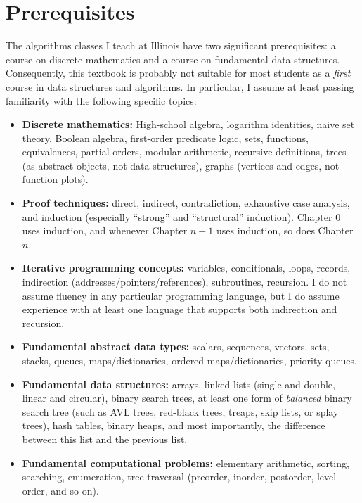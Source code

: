 \section*{Prerequisites}

The algorithms classes I teach at Illinois have two significant prerequisites: a course on discrete mathematics and a course on fundamental data structures. Consequently, this textbook is probably not suitable for most students as a \textit{first} course in data structures and algorithms. In particular, I assume at least passing familiarity with the following specific topics:

\begin{itemize}
\item \textbf{Discrete mathematics:} High-school algebra, logarithm identities, naive set theory, Boolean algebra, first-order predicate logic, sets, functions, equivalences, partial orders, modular arithmetic, recursive definitions, trees (as abstract objects, not data structures), graphs (vertices and edges, not function plots).
\item \textbf{Proof techniques:} direct, indirect, contradiction, exhaustive case analysis, and induction (especially “strong” and “structural” induction). Chapter 0 uses induction, and whenever Chapter $n-1$ uses induction, so does Chapter $n$.
\item \textbf{Iterative programming concepts:} variables, conditionals, loops, records, indirection (addresses/pointers/references), subroutines, recursion. I do not assume fluency in any particular programming language, but I do assume experience with at least one language that supports both indirection and recursion.
\item \textbf{Fundamental abstract data types:} scalars, sequences, vectors, sets, stacks, queues, maps/dictionaries, ordered maps/dictionaries, priority queues.
\item \textbf{Fundamental data structures:} arrays, linked lists (single and double, linear and circular), binary search trees, at least one form of \textit{balanced} binary search tree (such as AVL trees, red-black trees, treaps, skip lists, or splay trees), hash tables, binary heaps, and most importantly, the difference between this list and the previous list.
\item \textbf{Fundamental computational problems:} elementary arithmetic, sorting, searching, enumeration, tree traversal (preorder, inorder, postorder, level-order, and so on).

\end{itemize}

